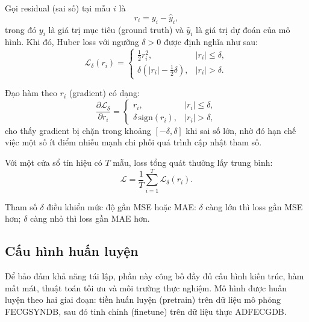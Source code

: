 \documentclass[../DoAn.tex]{subfiles}
\begin{document}
Gọi residual (sai số) tại mẫu $i$ là
\begin{equation}
  r_i = y_i - \hat{y}_i,
\end{equation}
trong đó $y_i$ là giá trị mục tiêu (ground truth) và $\hat{y}_i$ là giá trị dự đoán của mô hình. Khi đó, Huber loss với ngưỡng $\delta>0$ được định nghĩa như sau:
\begin{equation}
  \mathcal{L}_\delta(r_i)=
  \begin{cases}
    \frac{1}{2}r_i^2, & |r_i|\le \delta,\\[4pt]
    \delta\left(|r_i|-\frac{1}{2}\delta\right), & |r_i|>\delta.
  \end{cases}
\end{equation}

Đạo hàm theo $r_i$ (gradient) có dạng:
\begin{equation}
  \frac{\partial \mathcal{L}_\delta}{\partial r_i}=
  \begin{cases}
    r_i, & |r_i|\le \delta,\\[4pt]
    \delta\,\mathrm{sign}(r_i), & |r_i|>\delta,
  \end{cases}
\end{equation}
cho thấy gradient bị chặn trong khoảng $\left[-\delta,\delta\right]$ khi sai số lớn, nhờ đó hạn chế việc một số ít điểm nhiễu mạnh chi phối quá trình cập nhật tham số.

Với một cửa sổ tín hiệu có $T$ mẫu, loss tổng quát thường lấy trung bình:
\begin{equation}
  \mathcal{L}=\frac{1}{T}\sum_{i=1}^{T}\mathcal{L}_\delta(r_i).
\end{equation}

Tham số $\delta$ điều khiển mức độ gần MSE hoặc MAE: $\delta$ càng lớn thì loss gần MSE hơn; $\delta$ càng nhỏ thì loss gần MAE hơn.

\subsection{Cấu hình huấn luyện}

Để bảo đảm khả năng tái lập, phần này công bố đầy đủ cấu hình kiến trúc, hàm mất mát, thuật
toán tối ưu và môi trường thực nghiệm. Mô hình được huấn luyện theo hai giai đoạn: tiền
huấn luyện (pretrain) trên dữ liệu mô phỏng FECGSYNDB, sau đó tinh chỉnh (finetune)
trên dữ liệu thực ADFECGDB.
\end{document}
